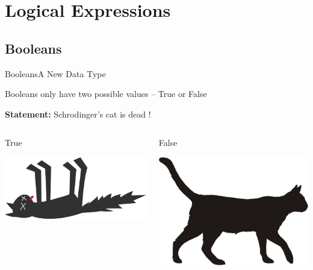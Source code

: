 \section{Logical Expressions}

\subsection{Booleans}
\begin{frame}[fragile]{Booleans}{A New Data Type}
    \begin{block}{}
        Booleans only have two possible values -- True or False
    \end{block}
    \vspace{1.5em}
    {\Large \textbf{Statement:} Schrodinger's cat is dead !}
    \begin{columns}[c]
            \begin{block}{True}
            \begin{center}
                \includegraphics[width=\linewidth]{images/dead_cat.jpg}
            \end{center}
            \end{block}
            \begin{block}{False}
            \begin{center}
                \includegraphics[width=\linewidth]{images/cat.jpg}
            \end{center}
            \end{block}
    \end{columns}
\end{frame}

